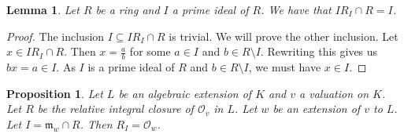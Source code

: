 \documentclass[12pt,a4paper]{amsart}
\newtheorem{prop}[thm]{Proposition}
\newtheorem{lem}[thm]{Lemma}
\theoremstyle{definition}
\begin{document}
\begin{lem}{\label{invloc}}
Let $R$ be a ring and $I$ a prime ideal of $R$.
We have that $IR_I\cap R=I$.
\end{lem}
\begin{proof}
The inclusion $I\subseteq IR_I\cap R$ is trivial.
We will prove the other inclusion.
Let $x\in IR_I\cap R$.
Then $x=\frac{a}{b}$ for some $a\in I$ and $b\in R\setminus I$.
Rewriting this gives us $bx=a\in I$.
As $I$ is a prime ideal of $R$ and $b\in R\setminus I$, we must have $x\in I$.
\end{proof}
\begin{prop}{\label{invmax}}
Let $L$ be an algebraic extension of $K$ and $v$ a valuation on $K$.
Let $R$ be the relative integral closure of $\mathcal{O}_v$ in $L$.
Let $w$ be an extension of $v$ to $L$.
Let $I=\mathfrak{m}_w\cap R$.
Then $R_I=\mathcal{O}_w$.
\end{prop}
\end{document}

